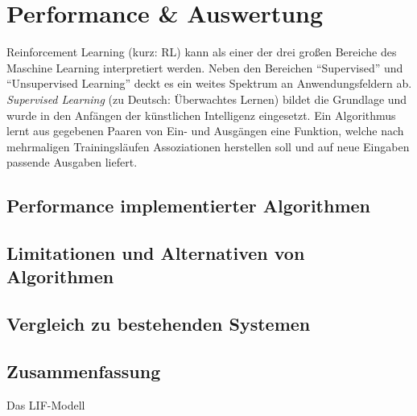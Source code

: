 %
\chapter{Performance \& Auswertung}
\label{chap:erg}
%

	Reinforcement Learning (kurz: RL) kann als einer der drei großen Bereiche des Maschine Learning interpretiert werden. Neben den Bereichen ``Supervised'' und ``Unsupervised Learning'' deckt es ein weites Spektrum an Anwendungsfeldern ab.\\
	\textit{Supervised Learning} (zu Deutsch: Überwachtes Lernen) bildet die Grundlage und wurde in den Anfängen der künstlichen Intelligenz eingesetzt. Ein Algorithmus lernt aus gegebenen Paaren von Ein- und Ausgängen eine Funktion, welche nach mehrmaligen Trainingsläufen Assoziationen herstellen soll und auf neue Eingaben passende Ausgaben liefert. 
		

\section{Performance implementierter Algorithmen}
\label{sec:erg_performance}
	
	
	
\section{Limitationen und Alternativen von Algorithmen}
\label{sec:erg_lim}

\section{Vergleich zu bestehenden Systemen}
\label{sec:erg_vgl}

\section{Zusammenfassung}
\label{sec:erg_zsm}
	\begin{algorithm}
		
		
		
		\caption{Das LIF-Modell}
	\end{algorithm}

